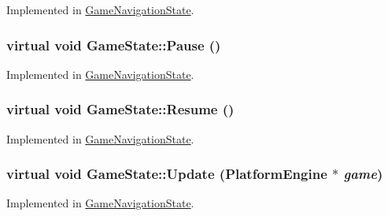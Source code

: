 Implemented in \hyperlink{class_game_navigation_state_8f613860bf544476ab9cff9fb7f98201}{GameNavigationState}.\hypertarget{class_game_state_1f4d2b5a2e4dcb7645e3e7a5735926a6}{
\subsubsection[{Pause}]{\setlength{\rightskip}{0pt plus 5cm}virtual void GameState::Pause ()}}
\label{class_game_state_1f4d2b5a2e4dcb7645e3e7a5735926a6}




Implemented in \hyperlink{class_game_navigation_state_ac626b511de8af9f32b7a1492a10f861}{GameNavigationState}.\hypertarget{class_game_state_cf9bcd5b47ebb3f572389f64c5ca5ed4}{
\subsubsection[{Resume}]{\setlength{\rightskip}{0pt plus 5cm}virtual void GameState::Resume ()}}
\label{class_game_state_cf9bcd5b47ebb3f572389f64c5ca5ed4}




Implemented in \hyperlink{class_game_navigation_state_4d6aee55eddb1978f493206d985fb950}{GameNavigationState}.\hypertarget{class_game_state_100ca49bc95afce1d5c5b756708bbc2b}{
\subsubsection[{Update}]{\setlength{\rightskip}{0pt plus 5cm}virtual void GameState::Update ({\bf PlatformEngine} $\ast$ {\em game})}}
\label{class_game_state_100ca49bc95afce1d5c5b756708bbc2b}




Implemented in \hyperlink{class_game_navigation_state_90f5e6d6287a875d8f2737180f46a004}{GameNavigationState}.